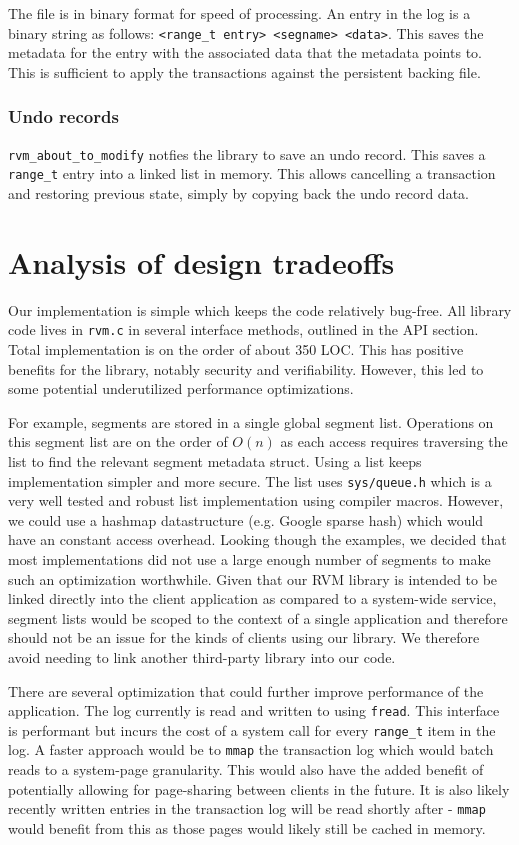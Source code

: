 \documentclass{report} %
\numberwithin{equation}{section} %
\numberwithin{figure}{section} %
\numberwithin{table}{section} %
\begin{document}
The file is in binary format for speed of processing. An entry in the log is a binary string as follows: \texttt{<range\_t entry> <segname> <data>}. This saves the metadata for the entry with the associated data that the metadata points to. This is sufficient to apply the transactions against the persistent backing file.


\subsubsection{Undo records}
\texttt{rvm\_about\_to\_modify} notfies the library to save an undo record. This saves a \texttt{range\_t} entry into a linked list in memory. This allows cancelling a transaction and restoring previous state, simply by copying back the undo record data.


\section{Analysis of design tradeoffs}

Our implementation is simple which keeps the code relatively bug-free. All library code lives in \texttt{rvm.c} in several interface methods, outlined in the API section. Total implementation is on the order of about 350 LOC. This has positive benefits for the library, notably security and verifiability. However, this led to some potential underutilized performance optimizations.

For example, segments are stored in a single global segment list. Operations on this segment list are on the order of $O(n)$ as each access requires traversing the list to find the relevant segment metadata struct. Using a list keeps implementation simpler and more secure. The list uses \texttt{sys/queue.h} which is a very well tested and robust list implementation using compiler macros. However, we could use a hashmap datastructure (e.g. Google sparse hash) which would have an constant access overhead. Looking though the examples, we decided that most implementations did not use a large enough number of segments to make such an optimization worthwhile. Given that our RVM library is intended to be linked directly into the client application as compared to a system-wide service, segment lists would be scoped to the context of a single application and therefore should not be an issue for the kinds of clients using our library. We therefore avoid needing to link another third-party library into our code.

There are several optimization that could further improve performance of the application. The log currently is read and written to using \texttt{fread}. This interface is performant but incurs the cost of a system call for every \texttt{range\_t} item in the log. A faster approach would be to \texttt{mmap} the transaction log which would batch reads to a system-page granularity. This would also have the added benefit of potentially allowing for page-sharing between clients in the future. It is also likely recently written entries in the transaction log will be read shortly after - \texttt{mmap} would benefit from this as those pages would likely still be cached in memory.
\end{document}
